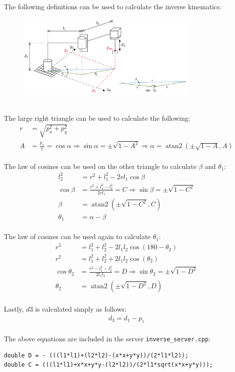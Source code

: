 \documentclass[10pt]{article}
\DeclareMathOperator{\atantwo}{atan2}
\begin{document}
\begin{enumerate}
	The following definitions can be used to calculate the inverse kinematics:
	\begin{figure}[h]
		\centering
		\includegraphics[width=0.8\textwidth]{figures/rrp_IK.png}
	\end{figure}
	\\
	The large right triangle can be used to calculate the following:
	\begin{align*}
		r &= \sqrt{p_x^2 + p_y^2} \\
		A &= \frac{p_x}{r} = \cos\alpha \Rightarrow
		\sin \alpha = \pm \sqrt{1 - A^2} \Rightarrow \alpha = \atantwo\left(\pm \sqrt{1-A}, A\right)
	\end{align*}
	\\
	The law of cosines can be used on the other triangle to calculate $\beta$ and $\theta_1$:
	\begin{align*}
		l_2^2 &= r^2 + l_1^2 - 2 r l_1 \cos\beta \\
		\cos\beta & = \frac{r^2 + l_1^2 - l_2^2}{2 r l_1} = C \Rightarrow \sin\beta = \pm\sqrt{1-C^2} \\
		\beta &= \atantwo\left(\pm\sqrt{1-C^2}, C\right) \\
		\theta_1 &= \alpha - \beta
	\end{align*}
	\\
	The law of cosines can be used again to calculate $\theta_1$:
	\begin{align*}
		r^2 &= l_1^2 + l_2^2 - 2 l_1 l_2 \cos(180-\theta_2) \\
		r^2 &= l_1^2 + l_2^2 + 2 l_1 l_2 \cos(\theta_2) \\
		\cos\theta_2 & = \frac{r^2 - l_1^2 - l_2^2}{2 l_1 l_2} = D \Rightarrow \sin\theta_2 = \pm\sqrt{1-D^2} \\
		\theta_2 &= \atantwo\left(\pm\sqrt{1-D^2}, D\right)
	\end{align*}
	\\
	Lastly, $d3$ is calculated simply as follows:
	\begin{align*}
		d_3 = d_1 - p_z
	\end{align*}
	\\
	The above equations are included in the server \texttt{inverse\_server.cpp}:
\begin{lstlisting}[style=Matlab-editor,basicstyle=\mlttfamily,escapechar=`]
double D = - (((l1*l1)+(l2*l2)-(x*x+y*y))/(2*l1*l2));
double C = (((l1*l1)+x*x+y*y-(l2*l2))/(2*l1*sqrt(x*x+y*y)));


\end{lstlisting}
\end{enumerate}
\end{document}

